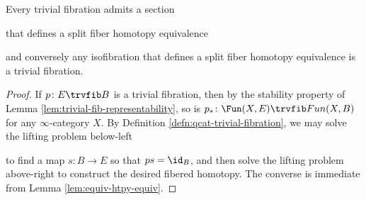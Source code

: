 \begin{lem}\label{lem:split-triv-fib}
  Every trivial fibration admits a section
\begin{center}
\end{center}
that defines a split fiber homotopy equivalence
\begin{center}
\end{center}
and conversely any isofibration that defines a split fiber homotopy equivalence is a trivial fibration.
\end{lem}
\begin{proof}
If $p \colon E \trvfib B$ is a trivial fibration, then by the stability property of Lemma \ref{lem:trivial-fib-representability}, so is $p_*\colon\Fun(X,E)\trvfib Fun(X,B)$ for any $\infty$-category $X$.  By Definition \ref{defn:qcat-trivial-fibration}, we may solve the lifting problem below-left
\begin{center}
\end{center}
to find a map $s \colon B \to E$ so that $ps = \id_B$, and then solve the lifting problem above-right to construct the desired fibered homotopy. The converse is immediate from Lemma \ref{lem:equiv-htpy-equiv}.
\end{proof}

